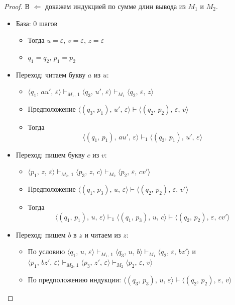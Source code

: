 \documentclass[a4paper,12pt]{article}
\theoremstyle{plain}
\theoremstyle{definition}
\theoremstyle{remark}
\begin{document}
\begin{proof}
	В $\Leftarrow$ докажем индукцией по сумме длин вывода из $M_1$ и $M_2$.
	\begin{itemize}
		\item База: 0 шагов
		\begin{itemize}
			\item Тогда $u = \varepsilon,\, v = \varepsilon,\, z = \varepsilon$
			\item $q_1 = q_2,\, p_1 = p_2$
		\end{itemize}
		\item Переход: читаем букву $a$ из $u$:
		\begin{itemize}
			\item $\langle q_1,\,au',\,\varepsilon\rangle\vdash_{M_1,\,1}\langle q_3,\,u',\,\varepsilon\rangle\vdash_{M_1}\langle q_2,\,\varepsilon,\,z\rangle$
			\item Предположение $\langle(q_3,\,p_1),\,u',\,\varepsilon\rangle \vdash \langle(q_2,\,p_2),\,\varepsilon,\,v\rangle$
			\item Тогда
			\[
				\langle(q_1,\,p_1),\,au',\,\varepsilon\rangle\vdash_1\langle(q_3,\,p_1),\,u',\,\varepsilon\rangle
			\]
		\end{itemize}
		\item Переход: пишем букву $c$ из $v$:
		\begin{itemize}
			\item $\langle p_1,\,z,\,\varepsilon\rangle\vdash_{M_2,\,1}\langle p_3,\,z,\,c\rangle\vdash_{M_2}\langle p_2,\,\varepsilon,\,cv'\rangle$
			\item Предположение $\langle(q_1,\,p_3),\,u,\,\varepsilon\rangle\vdash\langle(q_2,\,p_2),\,\varepsilon,\,v'\rangle$
			\item Тогда
			\[
				\langle(q_1,\,p_1),\,u,\,\varepsilon\rangle\vdash_1\langle(q_1,\,p_3),\,u,\,c\rangle\vdash\langle(q_2,\,p_2),\,\varepsilon,\,cv'\rangle
			\]
		\end{itemize}
		\item Переход: пишем $b$ в $z$ и читаем из $z$:
		\begin{itemize}
			\item По условию $\langle q_1,\,u,\,\varepsilon\rangle\vdash_{M_1,\,1}\langle q_3,\,u,\,b\rangle\vdash_{M_1}\langle q_2,\,\varepsilon,\, bz'\rangle$ и $\langle p_1,\,bz',\,\varepsilon\rangle\vdash_{M_2,\,1}\langle p_3,\,z',\,\varepsilon\rangle\vdash_{M_2}\langle p_2,\,\varepsilon,\,v\rangle$
			\item По предположению индукции: $\langle(q_3,\,p_3),\,u,\,\varepsilon\rangle\vdash\langle(q_2,\,p_2),\,\varepsilon,\,v\rangle$

\end{itemize}
\end{itemize}
\end{proof}
\end{document}
